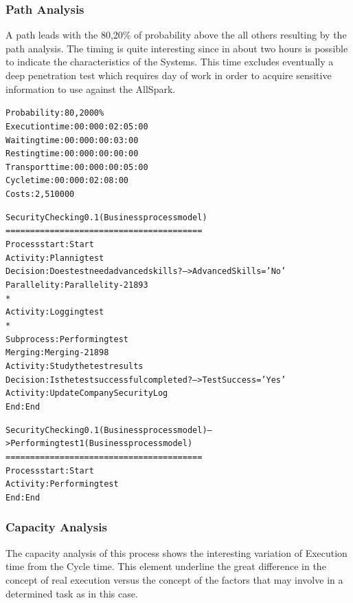 \subsubsection{Path Analysis}
A path leads with the 80,20\% of probability above the all others resulting by the path analysis. The timing is quite interesting since in about two hours is possible to indicate the characteristics of the Systems. This time excludes eventually a deep penetration test which requires day of work in order to acquire sensitive information to use against the AllSpark.

\begin{alltt}
Probability:   80,2000\%
Execution time:  00:000:02:05:00
Waiting time:  00:000:00:03:00
Resting time:  00:000:00:00:00
Transport time:  00:000:00:05:00
Cycle time:  00:000:02:08:00
Costs:  2,510000

Security Checking 0.1 (Business process model)
========================================
Process start: Start
Activity: Plannig test
Decision: Does test need advanced skills? --> AdvancedSkills='No'
Parallelity: Parallelity-21893
    *
    Activity: Logging test
    *
    Subprocess: Performing test
Merging: Merging-21898
Activity: Study the test results
Decision: Is the test successful completed? --> TestSuccess='Yes'
Activity: Update Company Security Log
End: End

Security Checking 0.1 (Business process model) --> Performing test 1 (Business process model)
========================================
Process start: Start
Activity: Performing test
End: End
\end{alltt}


\subsubsection{Capacity Analysis}
The capacity analysis of this process shows the interesting variation of Execution time from the Cycle time. This element underline the great difference in the concept of real execution versus the concept of the factors that may involve in a determined task as in this case.

